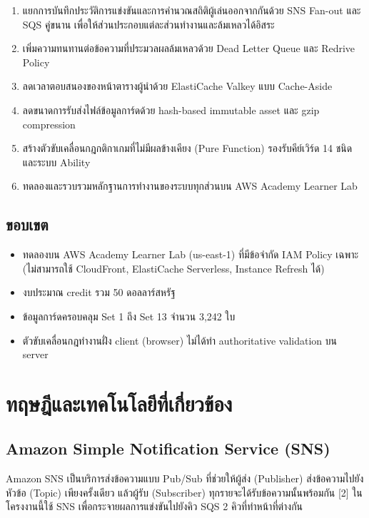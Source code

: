 \documentclass[12pt,a4paper]{report}
\begin{document}
\begin{enumerate}
    \item แยกการบันทึกประวัติการแข่งขันและการคำนวณสถิติผู้เล่นออกจากกันด้วย SNS Fan-out และ SQS คู่ขนาน เพื่อให้ส่วนประกอบแต่ละส่วนทำงานและล้มเหลวได้อิสระ
    \item เพิ่มความทนทานต่อข้อความที่ประมวลผลล้มเหลวด้วย Dead Letter Queue และ Redrive Policy
    \item ลดเวลาตอบสนองของหน้าตารางผู้นำด้วย ElastiCache Valkey แบบ Cache-Aside
    \item ลดขนาดการรับส่งไฟล์ข้อมูลการ์ดด้วย hash-based immutable asset และ gzip compression
    \item สร้างตัวขับเคลื่อนกฎกติกาเกมที่ไม่มีผลข้างเคียง (Pure Function) รองรับคีย์เวิร์ด 14 ชนิดและระบบ Ability
    \item ทดลองและรวบรวมหลักฐานการทำงานของระบบทุกส่วนบน AWS Academy Learner Lab
\end{enumerate}

\section{ขอบเขต}

\begin{itemize}
    \item ทดลองบน AWS Academy Learner Lab (us-east-1) ที่มีข้อจำกัด IAM Policy เฉพาะ (ไม่สามารถใช้ CloudFront, ElastiCache Serverless, Instance Refresh ได้)
    \item งบประมาณ credit รวม 50 ดอลลาร์สหรัฐ
    \item ข้อมูลการ์ดครอบคลุม Set 1 ถึง Set 13 จำนวน 3,242 ใบ
    \item ตัวขับเคลื่อนกฎทำงานฝั่ง client (browser) ไม่ได้ทำ authoritative validation บน server
\end{itemize}

\chapter{ทฤษฎีและเทคโนโลยีที่เกี่ยวข้อง}

\section{Amazon Simple Notification Service (SNS)}

Amazon SNS เป็นบริการส่งข้อความแบบ Pub/Sub ที่ช่วยให้ผู้ส่ง (Publisher) ส่งข้อความไปยังหัวข้อ (Topic) เพียงครั้งเดียว แล้วผู้รับ (Subscriber) ทุกรายจะได้รับข้อความนั้นพร้อมกัน [2] ในโครงงานนี้ใช้ SNS เพื่อกระจายผลการแข่งขันไปยังคิว SQS 2 คิวที่ทำหน้าที่ต่างกัน
\end{document}
